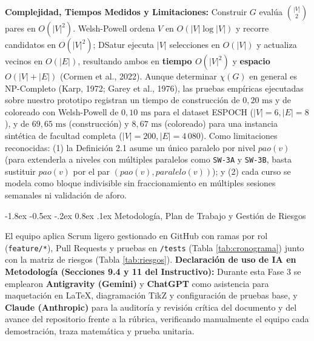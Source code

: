 \documentclass[12pt,a4paper]{article}
\makeatletter
\renewcommand\section{\@startsection {section}{1}{\z@}%
                                   {-1.8ex \@plus -0.5ex \@minus -.2ex}%
                                   {0.8ex \@plus.1ex}%
                                   {\normalfont\large\bfseries}}
\theoremstyle{definition}
\makeatother
\begin{document}
\textbf{Complejidad, Tiempos Medidos y Limitaciones:} Construir $G$ evalúa $\binom{|V|}{2}$ pares en $O(|V|^2)$. Welsh-Powell ordena $V$ en $O(|V| \log |V|)$ y recorre candidatos en $O(|V|^2)$; DSatur ejecuta $|V|$ selecciones en $O(|V|)$ y actualiza vecinos en $O(|E|)$, resultando ambos en \textbf{tiempo $O(|V|^2)$} y \textbf{espacio $O(|V| + |E|)$} (Cormen et al., 2022). Aunque determinar $\chi(G)$ en general es NP-Completo (Karp, 1972; Garey et al., 1976), las pruebas empíricas ejecutadas sobre nuestro prototipo registran un tiempo de construcción de $0{,}20\text{ ms}$ y de coloreado con Welsh-Powell de $0{,}10\text{ ms}$ para el dataset ESPOCH ($|V|=6, |E|=8$), y de $69{,}65\text{ ms}$ (construcción) y $8{,}67\text{ ms}$ (coloreado) para una instancia sintética de facultad completa ($|V|=200, |E|=4\,080$). Como limitaciones reconocidas: (1) la Definición 2.1 asume un único paralelo por nivel $pao(v)$ (para extenderla a niveles con múltiples paralelos como \texttt{SW-3A} y \texttt{SW-3B}, basta sustituir $pao(v)$ por el par $(pao(v), paralelo(v))$); y (2) cada curso se modela como bloque indivisible sin fraccionamiento en múltiples sesiones semanales ni validación de aforo.

\section{Metodología, Plan de Trabajo y Gestión de Riesgos}

El equipo aplica Scrum ligero gestionado en GitHub con ramas por rol (\texttt{feature/*}), Pull Requests y pruebas en \texttt{/tests} (Tabla \ref{tab:cronograma}) junto con la matriz de riesgos (Tabla \ref{tab:riesgos}).
\textbf{Declaración de uso de IA en Metodología (Secciones 9.4 y 11 del Instructivo):} Durante esta Fase 3 se emplearon \textbf{Antigravity (Gemini)} y \textbf{ChatGPT} como asistencia para maquetación en \LaTeX{}, diagramación TikZ y configuración de pruebas base, y \textbf{Claude (Anthropic)} para la auditoría y revisión crítica del documento y del avance del repositorio frente a la rúbrica, verificando manualmente el equipo cada demostración, traza matemática y prueba unitaria.
\end{document}
